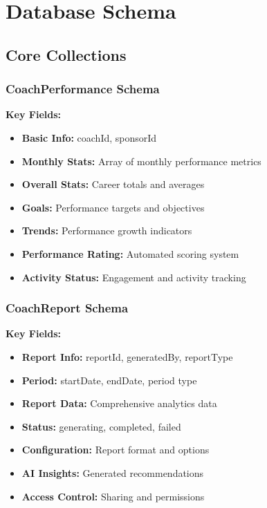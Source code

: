 \documentclass[12pt,a4paper]{article}
\begin{document}
\section{Database Schema}

\subsection{Core Collections}

\subsubsection{CoachPerformance Schema}
\textbf{Key Fields:}
\begin{itemize}
    \item \textbf{Basic Info:} coachId, sponsorId
    \item \textbf{Monthly Stats:} Array of monthly performance metrics
    \item \textbf{Overall Stats:} Career totals and averages
    \item \textbf{Goals:} Performance targets and objectives
    \item \textbf{Trends:} Performance growth indicators
    \item \textbf{Performance Rating:} Automated scoring system
    \item \textbf{Activity Status:} Engagement and activity tracking
\end{itemize}

\subsubsection{CoachReport Schema}
\textbf{Key Fields:}
\begin{itemize}
    \item \textbf{Report Info:} reportId, generatedBy, reportType
    \item \textbf{Period:} startDate, endDate, period type
    \item \textbf{Report Data:} Comprehensive analytics data
    \item \textbf{Status:} generating, completed, failed
    \item \textbf{Configuration:} Report format and options
    \item \textbf{AI Insights:} Generated recommendations
    \item \textbf{Access Control:} Sharing and permissions
\end{itemize}
\end{document}
